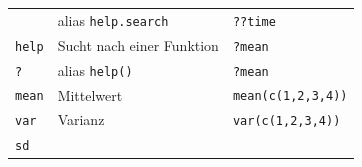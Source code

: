 \documentclass[]{book}
\begin{document}
\begin{longtable}[]{@{}lll@{}}
\begin{minipage}[t]{0.30\columnwidth}
\end{minipage} & \begin{minipage}[t]{0.28\columnwidth}\raggedright
alias \texttt{help.search}\strut
\end{minipage} & \begin{minipage}[t]{0.33\columnwidth}\raggedright
\texttt{??time}\strut
\end{minipage}\tabularnewline
\begin{minipage}[t]{0.30\columnwidth}\raggedright
\texttt{help}\strut
\end{minipage} & \begin{minipage}[t]{0.28\columnwidth}\raggedright
Sucht nach einer Funktion\strut
\end{minipage} & \begin{minipage}[t]{0.33\columnwidth}\raggedright
\texttt{?mean}\strut
\end{minipage}\tabularnewline
\begin{minipage}[t]{0.30\columnwidth}\raggedright
\texttt{?}\strut
\end{minipage} & \begin{minipage}[t]{0.28\columnwidth}\raggedright
alias \texttt{help()}\strut
\end{minipage} & \begin{minipage}[t]{0.33\columnwidth}\raggedright
\texttt{?mean}\strut
\end{minipage}\tabularnewline
\begin{minipage}[t]{0.30\columnwidth}\raggedright
\texttt{mean}\strut
\end{minipage} & \begin{minipage}[t]{0.28\columnwidth}\raggedright
Mittelwert\strut
\end{minipage} & \begin{minipage}[t]{0.33\columnwidth}\raggedright
\texttt{mean(c(1,2,3,4))}\strut
\end{minipage}\tabularnewline
\begin{minipage}[t]{0.30\columnwidth}\raggedright
\texttt{var}\strut
\end{minipage} & \begin{minipage}[t]{0.28\columnwidth}\raggedright
Varianz\strut
\end{minipage} & \begin{minipage}[t]{0.33\columnwidth}\raggedright
\texttt{var(c(1,2,3,4))}\strut
\end{minipage}\tabularnewline
\begin{minipage}[t]{0.30\columnwidth}\raggedright
\texttt{sd}\strut

\end{minipage}
\end{longtable}
\end{document}
